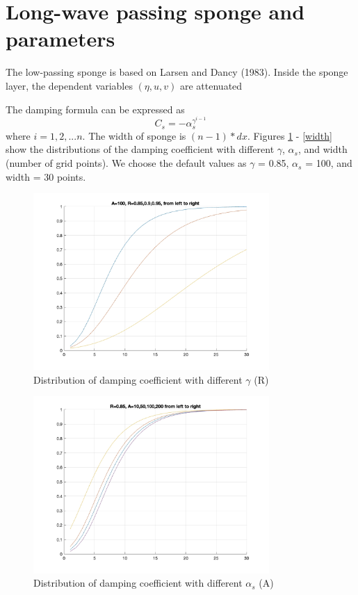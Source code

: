\documentclass[preprint,10pt]{elsarticle}
\newcommand{\be}{\begin{equation}}
\newcommand{\ee}{\end{equation}}
\begin{document}
\section{Long-wave passing sponge and parameters}

The low-passing sponge is based on Larsen and Dancy (1983). Inside the sponge layer, the dependent variables $(\eta, u, v)$ are attenuated 

The damping formula can be expressed as
\be
C_s = -\alpha_s^{\gamma^{i-1}}
\ee
where $i = 1, 2, ... n$. The width of sponge is $(n-1)*dx$.  Figures \ref{R} - \ref{width} show the distributions of the damping coefficient with different $\gamma$,  $\alpha_s$, and width (number of grid points). We choose the default values as   $\gamma$ = 0.85, $\alpha_s$ = 100, and width = 30 points. 

 \begin{figure}
\begin{center}
 \includegraphics[width=0.8\textwidth]{figures/test_sponge_R.jpg}
 \caption{Distribution of damping coefficient with different $\gamma$ (R) }
 \label{R}
 \end{center}
 \end{figure}  

 \begin{figure}
\begin{center}
 \includegraphics[width=0.8\textwidth]{figures/test_sponge_A.jpg}
 \caption{Distribution of damping coefficient with different $\alpha_s$ (A) }
 \label{A}
 \end{center}
 \end{figure}  
 
\end{document}
